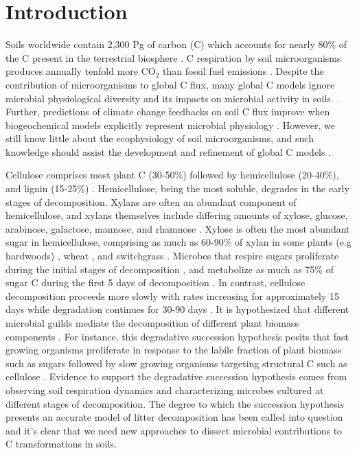 \section{Introduction}
Soils worldwide contain 2,300 Pg of carbon (C) which accounts for nearly 80\%
of the C present in the terrestrial biosphere
\citep{Amundson_2001,BATJES_1996}. C respiration by soil microorganisms
produces annually tenfold more CO$_{2}$ than fossil fuel emissions
\citep{chapin2002principles}. Despite the contribution of microorganisms to
global C flux, many global C models ignore microbial
physiological diversity and its impacts on microbial activity in soils.
\citep{Allison2010,Six2006,Treseder2011}. Further, predictions of climate
change feedbacks on soil C flux improve when biogeochemical models explicitly
represent microbial physiology \citep{Wieder2013}. However, we still know
little about the ecophysiology of soil microorganisms, and such knowledge
should assist the development and refinement of global C models
\citep{Bradford2008,Neff_2001,McGuire2010}.

Cellulose comprises most plant C (30-50\%) followed by hemicellulose (20-40\%),
and lignin (15-25\%) \citep{Lynd2002}. Hemicellulose, being the most soluble,
degrades in the early stages of decomposition. Xylans are often an abundant
component of hemicellulose, and xylans themselves include differing amounts of
xylose, glucose, arabinose, galactose, mannose, and rhamnose \citep{Saha2003}.
Xylose is often the most abundant sugar in hemicellulose, comprising as much as
60-90\% of xylan in some plants (e.g hardwoods) \citep{Spiridon2008}, wheat
\citep{Sun2005}, and switchgrass \citep{Bunnell2013}. Microbes that respire
sugars proliferate during the initial stages of decomposition
\citep{Garrett1951,Alexander1964}, and metabolize as much as 75\% of sugar
C during the first 5 days of decomposition \citep{Engelking2007}. In contrast,
cellulose decomposition proceeds more slowly with rates increasing for
approximately 15 days while degradation continues for 30-90 days
\citep{Hu1997,Engelking2007}. It is hypothesized that different microbial
guilds mediate the decomposition of different plant biomass
components \citep{Hu1997,Rui2009,AnneliseHKjoller2002,Bastian2009}. For
instance, this degradative succession hypothesis posits that fast growing
organisms proliferate in response to the labile fraction of plant
biomass such as sugars \citep{Garrett1963,Bremer1994} followed by slow growing
organisms targeting structural C such as cellulose \citep{Garrett1963}.
Evidence to support the degradative succession hypothesis comes from observing
soil respiration dynamics and characterizing microbes cultured at different
stages of decomposition. The degree to which the succession hypothesis presents
an accurate model of litter decomposition has been called into question
\citep{AnneliseHKjoller2002,Frankland1998,Osono_2005} and it's clear that we
need new approaches to dissect microbial contributions to
C transformations in soils.

